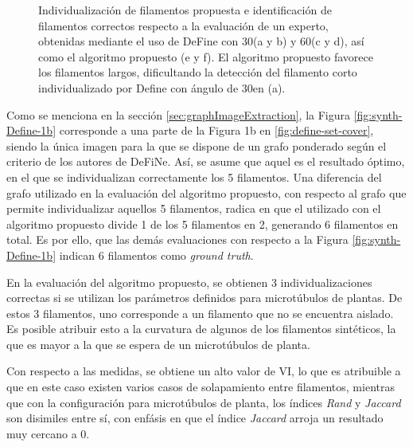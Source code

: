 \begin{figure}[h!]
    \caption{Individualizaci\'on de filamentos propuesta e identificaci\'on de filamentos correctos respecto a la evaluaci\'on de un experto, obtenidas mediante el uso de DeFine con 30\textdegree (a y b) y 60\textdegree (c y d), as\'i como el algoritmo propuesto (e y f). El algoritmo propuesto favorece los filamentos largos, dificultando la detecci\'on del filamento corto individualizado por Define con \'angulo de 30\textdegree en (a).}
    \label{fig:Synth-QIFS-Result}
\end{figure}

\clearpage
\newpage




Como se menciona en la secci\'on \ref{sec:graphImageExtraction}, la Figura \ref{fig:synth-Define-1b} corresponde a una parte de la Figura 1b en \ref{fig:define-set-cover}, siendo la \'unica imagen para la que se dispone de un grafo ponderado seg\'un el criterio de los autores de DeFiNe. As\'i, se asume que aquel es el resultado \'optimo, en el que se individualizan correctamente los 5 filamentos. Una diferencia del grafo utilizado en la evaluaci\'on del algoritmo propuesto, con respecto al grafo que permite individualizar aquellos 5 filamentos, radica en que el utilizado con el algoritmo propuesto divide 1 de los 5 filamentos en 2, generando 6 filamentos en total. Es por ello, que las dem\'as evaluaciones con respecto a la Figura \ref{fig:synth-Define-1b} indican 6 filamentos como {\it ground truth}.


En la evaluaci\'on del algoritmo propuesto, se obtienen 3 individualizaciones correctas si se utilizan los par\'ametros definidos para microt\'ubulos de plantas. De estos 3 filamentos, uno corresponde a un filamento que no se encuentra aislado. Es posible atribuir esto a la curvatura de algunos de los filamentos sint\'eticos, la que es mayor a la que se espera de un microt\'ubulos de planta.


Con respecto a las medidas, se obtiene un alto valor de VI, lo que es atribuible a que en este caso existen varios casos de solapamiento entre filamentos, mientras que con la configuraci\'on para microt\'ubulos de planta, los \'indices {\it Rand} y {\it Jaccard} son disimiles entre s\'i, con enf\'asis en que el \'indice {\it Jaccard} arroja un resultado muy cercano a 0.



